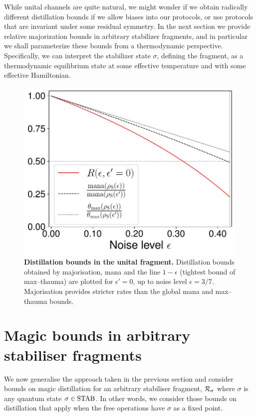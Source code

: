 \documentclass[pra,
aps,
twocolumn,
superscriptaddress,
groupedaddress,
nofootinbib,
reprint
]{revtex4-1}
\begin{document}
While unital channels are quite natural, we might wonder if we obtain radically different distillation bounds if we allow biases into our protocols, or use protocols that are invariant under some residual symmetry. In the next section we provide relative majorization bounds in arbitrary stabilizer fragments, and in particular we shall parameterize these bounds from a thermodynamic perspective. Specifically, we can interpret the stabilizer state $\sigma$, defining the fragment, as a thermodynamic equilibrium state at some effective temperature and with some effective Hamiltonian.
\begin{figure}[t]
    \centering
    \includegraphics[scale=0.45]{figs/distill_bounds.pdf}
    \caption{\textbf{Distillation bounds in the unital fragment.} Distillation bounds obtained by majorisation, mana and the line $1-\epsilon$ (tightest bound of max--thauma) are plotted for $\epsilon' = 0$, up to noise level $\epsilon = 3/7$.
    Majorisation provides stricter rates than the global mana and max--thauma bounds.
    }
    \label{fig:distill_bounds}
\end{figure}

\section{Magic bounds in arbitrary stabiliser fragments}
\label{sec:stab}

We now generalise the approach taken in the previous section and consider bounds on magic distillation for an arbitrary stabiliser fragment, $\mathcal{R}_\sigma$ where $\sigma$ is any quantum state $\sigma \in {\rm{STAB}}$.
In other words, we consider those bounds on distillation that apply when the free operations have $\sigma$ as a fixed point.
\end{document}
